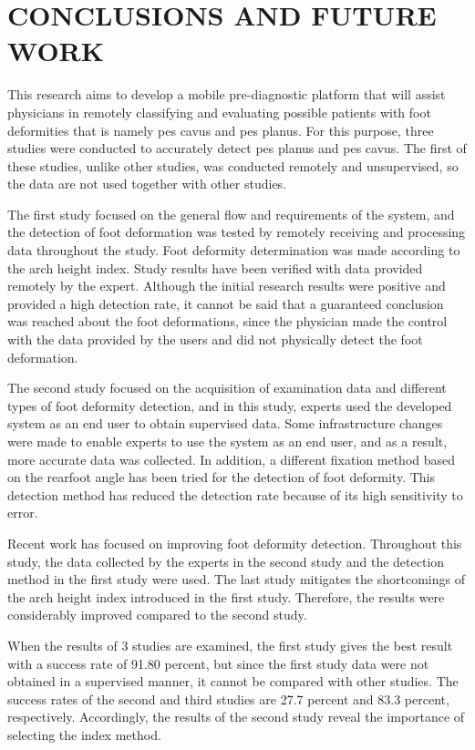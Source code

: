 \chapter{CONCLUSIONS AND FUTURE WORK}\label{chp:ConclusionsAndFutureWork}

This research aims to develop a mobile pre-diagnostic platform that will assist physicians in remotely classifying and evaluating possible patients with foot deformities that is namely pes cavus and pes planus. For this purpose, three studies were conducted to accurately detect pes planus and pes cavus. The first of these studies, unlike other studies, was conducted remotely and unsupervised, so the data are not used together with other studies.

The first study focused on the general flow and requirements of the system, and the detection of foot deformation was tested by remotely receiving and processing data throughout the study. Foot deformity determination was made according to the arch height index. Study results have been verified with data provided remotely by the expert. Although the initial research results were positive and provided a high detection rate, it cannot be said that a guaranteed conclusion was reached about the foot deformations, since the physician made the control with the data provided by the users and did not physically detect the foot deformation.

The second study focused on the acquisition of examination data and different types of foot deformity detection, and in this study, experts used the developed system as an end user to obtain supervised data. Some infrastructure changes were made to enable experts to use the system as an end user, and as a result, more accurate data was collected. In addition, a different fixation method based on the rearfoot angle has been tried for the detection of foot deformity. This detection method has reduced the detection rate because of its high sensitivity to error.

Recent work has focused on improving foot deformity detection. Throughout this study, the data collected by the experts in the second study and the detection method in the first study were used. The last study mitigates the shortcomings of the arch height index introduced in the first study. Therefore, the results were considerably improved compared to the second study.

When the results of 3 studies are examined, the first study gives the best result with a success rate of 91.80 percent, but since the first study data were not obtained in a supervised manner, it cannot be compared with other studies. The success rates of the second and third studies are 27.7 percent and 83.3 percent, respectively. Accordingly, the results of the second study reveal the importance of selecting the index method.


